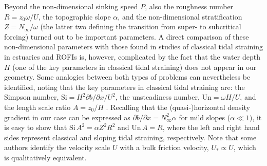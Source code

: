 Beyond the non-dimensional sinking speed $P$, also the roughness
number $R=z_0 \omega / U$, the topographic slope $\alpha$, and the
non-dimensional stratification $Z=N_\infty/\omega$ (the latter two
defining the transition from super- to subcritical forcing) turned out
to be important parameters. A direct comparison of these
non-dimensional parameters with those found in studies of classical
tidal straining in estuaries and ROFIs is, however, complicated by the
fact that the water depth $H$ (one of the key parameters in classical
tidal straining) does not appear in our geometry. Some analogies
between both types of problems can nevertheless be identified, noting
that the key parameters in classical tidal straining are: the Simpson
number, $\text{Si} = H^2 \partial b / \partial x / U^2$, the
unsteadiness number, $\text{Un} = \omega H / U$, and the length scale
ratio $A = z_0/H$
\citep[e.g.,][]{BurchardHetland2010a,Burchardetal2013a}. Recalling
that the (quasi-)horizontal density gradient in our case can be
expressed as $\partial b / \partial x = N_\infty^2 \alpha$ for mild
slopes ($\alpha \ll 1)$, it is easy to show that $\text{Si} \, A^2 =
\alpha Z^2 R^2$ and $\text{Un}\, A = R$, where the left and right hand
sides represent classical and sloping tidal straining,
respectively. Note that some authors identify the velocity scale $U$
with a bulk friction velocity, $U_* \propto U$, which is qualitatively
equivalent.

